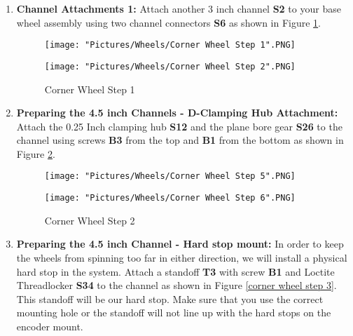 \documentclass[12pt]{article}
\begin{document}
\begin{enumerate}
\item \textbf{Channel Attachments 1:} Attach another 3 inch channel \textbf{S2} to your base wheel assembly using two channel connectors \textbf{S6} as shown in Figure \ref{corner wheel step 1}.

\begin{figure}[H]
  \centering
  \begin{minipage}[b]{0.45\textwidth}
    \texttt{[image: "Pictures/Wheels/Corner Wheel Step 1".PNG]}
  \end{minipage}
  \hfill
  \begin{minipage}[b]{0.45\textwidth}
    \texttt{[image: "Pictures/Wheels/Corner Wheel Step 2".PNG]}
  \end{minipage}
  \caption{Corner Wheel Step 1}
  \label{corner wheel step 1}
\end{figure}

\item \textbf{Preparing the 4.5 inch Channels - D-Clamping Hub Attachment:} Attach the 0.25 Inch clamping hub \textbf{S12} and the plane bore gear \textbf{S26} to the channel using screws \textbf{B3} from the top and \textbf{B1} from the bottom as shown in Figure \ref{corner wheel hub attachment}.

\begin{figure}[H]
  \centering
  \begin{minipage}[b]{0.45\textwidth}
    \texttt{[image: "Pictures/Wheels/Corner Wheel Step 5".PNG]}
  \end{minipage}
  \hfill
  \begin{minipage}[b]{0.45\textwidth}
    \texttt{[image: "Pictures/Wheels/Corner Wheel Step 6".PNG]}
  \end{minipage}
  \caption{Corner Wheel Step 2}
  \label{corner wheel hub attachment}
\end{figure}

\item \textbf{Preparing the 4.5 inch Channel - Hard stop mount:} In order to keep the wheels from spinning too far in either direction, we will install a physical hard stop in the system. Attach a standoff \textbf{T3} with screw \textbf{B1} and Loctite Threadlocker \textbf{S34} to the channel as shown in Figure \ref{corner wheel step 3}. This standoff will be our hard stop. Make sure that you use the correct mounting hole or the standoff will not line up with the hard stops on the encoder mount.


\end{enumerate}
\end{document}
